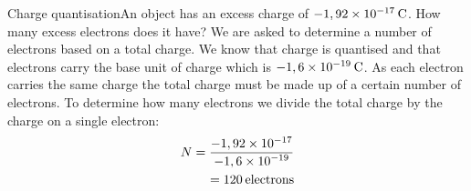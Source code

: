 \begin{wex}{Charge quantisation}{An object has an excess charge of $-1,92\ensuremath{\times}{10}^{-17}\phantom{\rule{2pt}{0ex}}\text{C}$. How many excess electrons does it have?}{
We are asked to determine a number of electrons based on a total charge. We know that charge is quantised and that electrons carry the base unit of charge which is $-1,6\ensuremath{\times}{10}^{-19}\phantom{\rule{2pt}{0ex}}\text{C}$.
 As each electron carries the same charge the total charge must be made up of a certain number of electrons. To determine how many electrons we divide the total charge by the charge on a single electron:\label{m38781*id1166032483813}\nopagebreak\noindent{}
    \begin{eqnarray*}
N=\frac{-1,92\ensuremath{\times}{10}^{-17}}{-1,6\ensuremath{\times}{10}^{-19}}\\ 
\phantom{x}=120\phantom{\rule{2pt}{0ex}}\text{electrons}
      \end{eqnarray*}}\end{wex}

